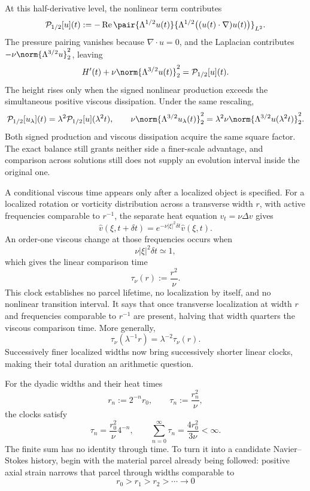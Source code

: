 
At this half-derivative level, the nonlinear term contributes
\[
  \mathcal P_{1/2}[u](t)
  :=
  -\operatorname{Re}
  \pair
    {\Lambda^{1/2}u(t)}
    {\Lambda^{1/2}\bigl((u(t)\cdot\nabla)u(t)\bigr)}_{L^2}.
\]
The pressure pairing vanishes because \(\nabla\cdot u=0\), and the Laplacian contributes \(-\nu\norm{\Lambda^{3/2}u}_2^2\), leaving
\[
  H'(t)
  +
  \nu\norm{\Lambda^{3/2}u(t)}_2^2
  =
  \mathcal P_{1/2}[u](t).
\]
The height rises only when the signed nonlinear production exceeds the simultaneous positive viscous dissipation. Under the same rescaling,
\[
  \mathcal P_{1/2}[u_\lambda](t)
  =
  \lambda^2\mathcal P_{1/2}[u](\lambda^2t),
  \qquad
  \nu\norm{\Lambda^{3/2}u_\lambda(t)}_2^2
  =
  \lambda^2\nu\norm{\Lambda^{3/2}u(\lambda^2t)}_2^2.
\]
Both signed production and viscous dissipation acquire the same square factor. The exact balance still grants neither side a finer-scale advantage, and comparison across solutions still does not supply an evolution interval inside the original one.


A conditional viscous time appears only after a localized object is specified. For a localized rotation or vorticity distribution across a transverse width \(r\), with active frequencies comparable to \(r^{-1}\), the separate heat equation \(v_t=\nu\Delta v\) gives
\[
  \widehat v(\xi,t+\delta t)
  =
  e^{-\nu|\xi|^2\delta t}\widehat v(\xi,t).
\]
An order-one viscous change at those frequencies occurs when
\[
  \nu|\xi|^2\delta t\simeq1,
\]
which gives the linear comparison time
\[
  \tau_\nu(r)
  :=
  \frac{r^2}{\nu}.
\]
This clock establishes no parcel lifetime, no localization by itself, and no nonlinear transition interval. It says that once transverse localization at width \(r\) and frequencies comparable to \(r^{-1}\) are present, halving that width quarters the viscous comparison time. More generally,
\[
  \tau_\nu(\lambda^{-1}r)
  =
  \lambda^{-2}\tau_\nu(r).
\]
Successively finer localized widths now bring successively shorter linear clocks, making their total duration an arithmetic question.


For the dyadic widths and their heat times
\[
  r_n:=2^{-n}r_0,
  \qquad
  \tau_n:=\frac{r_n^2}{\nu},
\]
the clocks satisfy
\[
  \tau_n
  =
  \frac{r_0^2}{\nu}4^{-n},
  \qquad
  \sum_{n=0}^{\infty}\tau_n
  =
  \frac{4r_0^2}{3\nu}
  <
  \infty.
\]
The finite sum has no identity through time. To turn it into a candidate Navier--Stokes history, begin with the material parcel already being followed: positive axial strain narrows that parcel through widths comparable to
\[
  r_0>r_1>r_2>\cdots\longrightarrow0
\]

